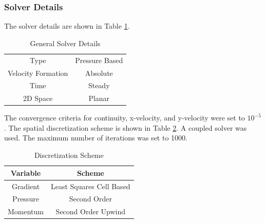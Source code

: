 \subsubsection{Solver Details}
The solver details are shown in Table \ref{tab:solver_details}.
\begin{table}[H]
    \centering
    \caption{General Solver Details}
    \label{tab:solver_details}
    \begin{tabular}{cc}
        \toprule
        Type & Pressure Based \\
        Velocity Formation & Absolute \\
        Time & Steady \\
        2D Space & Planar \\
        \bottomrule
    \end{tabular}
\end{table}
The convergence criteria for continuity, x-velocity, and y-velocity were set to $10^{-5}$. The spatial discretization scheme is shown in Table \ref{tab:discretization_scheme}. A coupled solver was used. The maximum number of iterations was set to 1000.
\begin{table}[H]
    \centering
    \caption{Discretization Scheme}
    \label{tab:discretization_scheme}
    \begin{tabular}{cc}
        \toprule
        Variable & Scheme \\
        \midrule
        Gradient & Least Squares Cell Based \\
        Pressure & Second Order \\
        Momentum & Second Order Upwind \\
        \bottomrule
    \end{tabular}
\end{table}







